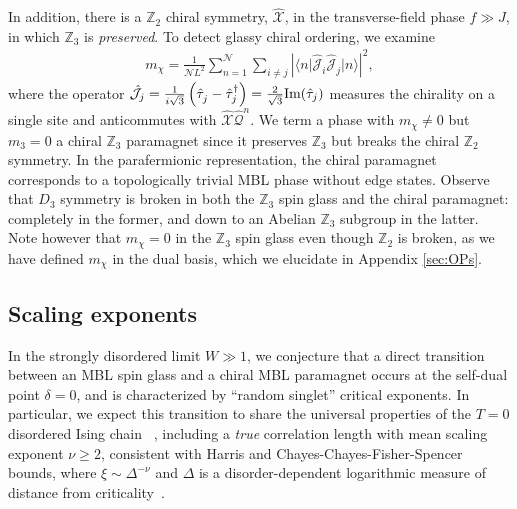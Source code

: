 \documentclass[prb,aps, twocolumn, superscriptaddress]{revtex4-1}
\newcommand{\be}{\begin{eqnarray}}
\newcommand{\ee}{\end{eqnarray}}
\def\ket#1{{|#1\rangle}}
\def\bra#1{{\langle #1 |}}
\begin{document}
 In addition, there is a ${\mathbb{Z}_2}$ chiral symmetry, $\hat{\mathcal{X}}$, in the transverse-field phase $f\gg J$, in which $\mathbb{Z}_3$ is \emph{preserved}. To detect glassy chiral ordering, we examine
\be
\label{eq:z2op}
m_{\chi} = \frac{1}{\mathcal{N}L^2}  \sum_{n=1}^{\mathcal{N}}\sum_{i\neq j}  \left|\bra{n}{\hat{\mathcal{J}}}_i {\hat{\mathcal{J}}}_j \ket{n}\right|^2,
\ee
where the operator ${\hat{\mathcal{J}}}_j = \frac{1}{i \sqrt{3}} \left( {\hat{\tau}}^{\vphantom{\dagger}}_j - {\hat{\tau}}^{\dagger}_j \right) = \frac{2}{\sqrt{3}} \text{Im}({\hat{\tau}}_j)$ measures the chirality on a single site and anticommutes with ${\hat{\mathcal{X}}} \hat{\mathcal{Q}}^{n}$. We term a phase with $m_{\chi}\neq0$ but $m_3=0$ a {chiral ${\mathbb{Z}_3}$ paramagnet} since it preserves ${\mathbb{Z}_3}$ but breaks the chiral ${\mathbb{Z}_2}$ symmetry. {In the parafermionic representation, the chiral paramagnet corresponds to a topologically trivial MBL phase without edge states.} Observe that $D_3$ symmetry is broken in both the ${\mathbb{Z}_3}$ spin glass and the chiral paramagnet: completely in the former, and down to an Abelian ${\mathbb{Z}_3}$ subgroup in the latter. Note however that $m_\chi =0$ in the ${\mathbb{Z}_3}$ spin glass even though ${\mathbb{Z}_2}$ is broken, as we have defined $m_\chi$ in the dual basis, which we elucidate in Appendix \ref{sec:OPs}.



\subsection{Scaling exponents}
\label{subsec:scaling}
In the strongly disordered limit $W \gg 1$, we conjecture that a direct transition between an MBL spin glass and a chiral MBL paramagnet occurs at the self-dual point $\delta = 0$, and is characterized by ``random singlet'' critical exponents. In particular, we expect this transition to share the universal properties of the $T=0$ disordered Ising chain~\cite{SenthilPotts}
, including a \emph{true} correlation length with mean scaling exponent $\nu \geq 2$, consistent with Harris and Chayes-Chayes-Fisher-Spencer bounds\cite{Chayes}, where $\xi \sim \Delta^{-\nu}$ and $\Delta$ is a disorder-dependent logarithmic measure of distance from criticality~\cite{FisherRSRG1,FisherRSRG2}. 
\end{document}
